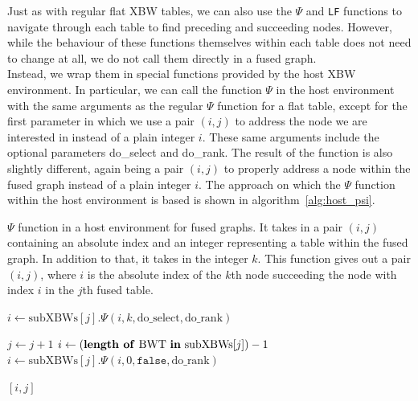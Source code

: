 \documentclass[a4paper,12pt,twoside,BCOR=10mm]{scrbook}
\begin{document}
Just as with regular flat XBW tables, we can also use the $ \Psi $ and \texttt{LF} functions 
to navigate through each table to find preceding and succeeding nodes. 
However, while the behaviour of these functions themselves within each table does not need to change 
at all, we do not call them directly in a fused graph. \\
Instead, we wrap them in special functions provided by the host XBW environment. 
In particular, we can call the function $\Psi$ in the host environment with the same arguments 
as the regular $ \Psi $ function for a flat table, except for the first parameter 
in which we use a pair $ (i, j) $ to address the node 
we are interested in instead of a plain integer $ i $. 
These same arguments include the optional parameters do\_select and do\_rank. 
The result of the function is also slightly different, again being a pair $ (i, j) $ to 
properly address a node within the fused graph instead of a plain integer $ i $. 
The approach on which the $ \Psi $ function within the host environment is based 
is shown in algorithm~\ref{alg:host_psi}. \\
\begin{algorithm}
\caption[$\Psi$ function in a host environment for fused graphs]{$\Psi$ function in a host environment for fused graphs. It takes in a pair $ (i, j) $ containing an absolute index and an integer representing a table within the fused graph. In addition to that, it takes in the integer $ k $. This function gives out a pair $ (i, j) $, where $ i $ is the absolute index of the $ k $th node succeeding the node with index $ i $ in the $ j $th fused table.}
\label{alg:host_psi}
\begin{algorithmic}[1]

\State $ i \gets \textrm{subXBWs}[ j ].{\Psi}( i, k, \textrm{do\_select}, \textrm{do\_rank} ) $

\State \phantom{nl}

	\State $ j \gets j + 1 $
	\State $ i \gets ( \textrm{\textbf{length of} BWT \textbf{in} subXBWs}[ j ] ) - 1 $
	\State $ i \gets \textrm{subXBWs}[ j ].{\Psi}( i, 0, \texttt{false}, \textrm{do\_rank} ) $
\EndIf

\State \phantom{nl}

\State \Return $ [ i, j ] $

\end{algorithmic}
\end{algorithm}
\end{document}
